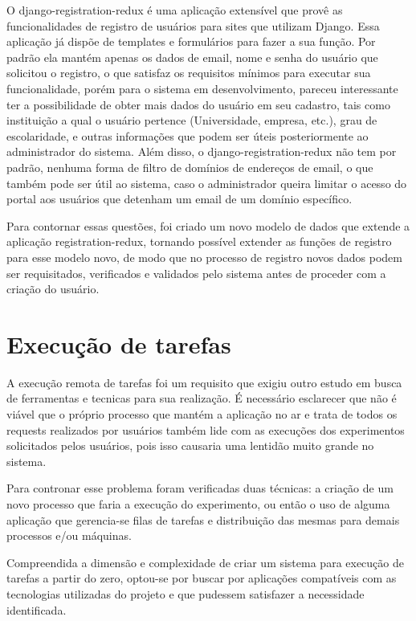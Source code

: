 \documentclass[tg]{mdtufsm}
\begin{document}
O django-registration-redux é uma aplicação extensível que provê as funcionalidades de registro de usuários para sites que utilizam Django. Essa aplicação já dispõe de templates e formulários para fazer a sua função. Por padrão ela mantém apenas os dados de email, nome e senha do usuário que solicitou o registro, o que satisfaz os requisitos mínimos para executar sua funcionalidade, porém para o sistema em desenvolvimento, pareceu interessante ter a possibilidade de obter mais dados do usuário em seu cadastro, tais como instituição a qual o usuário pertence (Universidade, empresa, etc.), grau de escolaridade, e outras informações que podem ser úteis posteriormente ao administrador do sistema.
Além disso, o django-registration-redux não tem por padrão, nenhuma forma de filtro de domínios de endereços de email, o que também pode ser útil ao sistema, caso o administrador queira limitar o acesso do portal aos usuários que detenham um email de um domínio específico.

Para contornar essas questões, foi criado um novo modelo de dados que extende a aplicação registration-redux, tornando possível extender as funções de registro para esse modelo novo, de modo que no processo de registro novos dados podem ser requisitados, verificados e validados pelo sistema antes de proceder com a criação do usuário.

\section{Execução de tarefas}
A execução remota de tarefas foi um requisito que exigiu outro estudo em busca de ferramentas e tecnicas para sua realização. É necessário esclarecer que não é viável que o próprio processo que mantém a aplicação no ar e trata de todos os requests realizados por usuários também lide com as execuções dos experimentos solicitados pelos usuários, pois isso causaria uma lentidão muito grande no sistema.

Para contronar esse problema foram verificadas duas técnicas: a criação de um novo processo que faria a execução do experimento, ou então o uso de alguma aplicação que gerencia-se filas de tarefas e distribuição das mesmas para demais processos e/ou máquinas.

Compreendida a dimensão e complexidade de criar um sistema para execução de tarefas a partir do zero, optou-se por buscar por aplicações compatíveis com as tecnologias utilizadas do projeto e que pudessem satisfazer a necessidade identificada.
\end{document}
